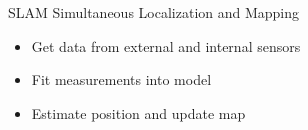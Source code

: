 \documentclass[17pt,mathserif]{beamer}
\begin{document}
    \begin{frame}{SLAM} {Simultaneous Localization and Mapping}
      \vspace*{-3em}
      \begin{center}
        \begin{itemize}
          \item Get data from external and internal sensors
          \item Fit measurements into model
          \item Estimate position and update map
        \end{itemize}
        \vspace*{-0.8em}
        \begin{figure}

        \end{figure}
      \end{center}
      
    \end{frame}
    
\end{document}
